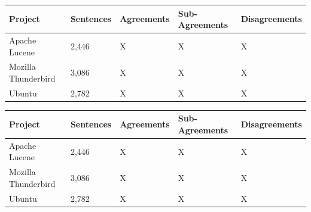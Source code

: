 \documentclass[a4paper,12pt,twoside]{report}
\begin{document}
\begin{table} %
    \centering
    \begin{adjustbox}{max width=\columnwidth}
    \def\arraystretch{1} %
    \begin{tabular}{p{4cm} p{3cm} p{3cm} p{3cm} p{3cm}}
        \toprule
        \textbf{Project} & \textbf{Sentences} & \textbf{Agreements} & \textbf{Sub-Agreements} & \textbf{Disagreements}\\
        \midrule
			Apache Lucene & 2,446 & X & X & X\\
			Mozilla Thunderbird & 3,086 & X & X & X\\ 
			Ubuntu & 2,782 & X & X & X\\
        \midrule
    \end{tabular}
    \end{adjustbox}
    \label{tab:labelBinary}
\end{table}

\begin{table} %
    \centering
    \begin{adjustbox}{max width=\columnwidth}
    \def\arraystretch{1} %
    \begin{tabular}{p{4cm} p{3cm} p{3cm} p{3cm} p{3cm}}
        \toprule
        \textbf{Project} & \textbf{Sentences} & \textbf{Agreements} & \textbf{Sub-Agreements} & \textbf{Disagreements}\\
        \midrule
			Apache Lucene & 2,446 & X & X & X\\
			Mozilla Thunderbird & 3,086 & X & X & X\\ 
			Ubuntu & 2,782 & X & X & X\\
        \midrule
    \end{tabular}
    \end{adjustbox}
    \label{tab:labelFine}
\end{table}
\end{document}
